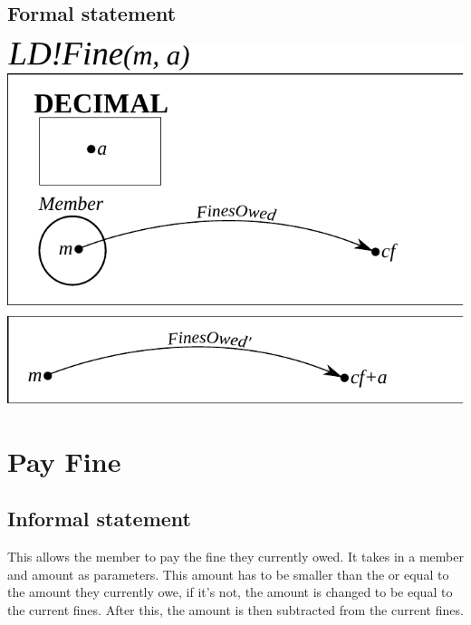 \documentclass[]{report}
\begin{document}
\subsection{Formal statement}
\begin{center}
	\includegraphics{add_fine.pdf}
\end{center}
\newpage
\section{Pay Fine}
\subsection{Informal statement}
This allows the member to pay the fine they currently owed. It takes in a member and amount as parameters. This amount has to be smaller than the or equal to the amount they currently owe, if it's not, the amount is changed to be equal to the current fines. After this, the amount is then subtracted from the current fines.
\end{document}
